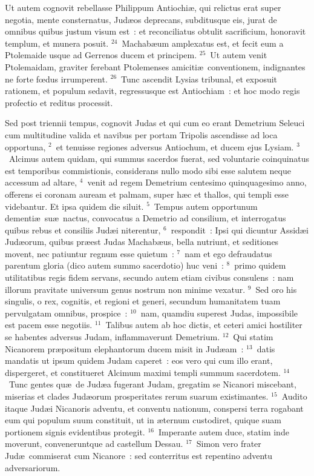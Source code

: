  Ut autem cognovit rebellasse Philippum Antiochi\ae , qui relictus erat super negotia, mente consternatus, Jud\ae os deprecans, subditusque eis, jurat de omnibus quibus justum visum est~: et reconciliatus obtulit sacrificium, honoravit templum, et munera posuit.
${}^{24}$~Machab\ae um amplexatus est, et fecit eum a Ptolemaide usque ad Gerrenos ducem et principem.
${}^{25}$~Ut autem venit Ptolemaidam, graviter ferebant Ptolemenses amiciti\ae\ conventionem, indignantes ne forte fœdus irrumperent.
${}^{26}$~Tunc ascendit Lysias tribunal, et exposuit rationem, et populum sedavit, regressusque est Antiochiam~: et hoc modo regis profectio et reditus processit.

\lettrine[lines=3,image=true,loversize=0.05,lraise=-0.03]{S}{}ed post triennii tempus, cognovit Judas et qui cum eo erant Demetrium Seleuci cum multitudine valida et navibus per portam Tripolis ascendisse ad loca opportuna,
${}^{2}$~et tenuisse regiones adversus Antiochum, et ducem ejus Lysiam.
${}^{3}$~Alcimus autem quidam, qui summus sacerdos fuerat, sed voluntarie coinquinatus est temporibus commistionis, considerans nullo modo sibi esse salutem neque accessum ad altare,
${}^{4}$~venit ad regem Demetrium centesimo quinquagesimo anno, offerens ei coronam auream et palmam, super h\ae c et thallos, qui templi esse videbantur. Et ipsa quidem die siluit.
${}^{5}$~Tempus autem opportunum dementi\ae\ su\ae\ nactus, convocatus a Demetrio ad consilium, et interrogatus quibus rebus et consiliis Jud\ae i niterentur,
${}^{6}$~respondit~: Ipsi qui dicuntur Assid\ae i Jud\ae orum, quibus pr\ae est Judas Machab\ae us, bella nutriunt, et seditiones movent, nec patiuntur regnum esse quietum~:
${}^{7}$~nam et ego defraudatus parentum gloria (dico autem summo sacerdotio) huc veni~:
${}^{8}$~primo quidem utilitatibus regis fidem servans, secundo autem etiam civibus consulens~: nam illorum pravitate universum genus nostrum non minime vexatur.
${}^{9}$~Sed oro his singulis, o rex, cognitis, et regioni et generi, secundum humanitatem tuam pervulgatam omnibus, prospice~:
${}^{10}$~nam, quamdiu superest Judas, impossibile est pacem esse negotiis.
${}^{11}$~Talibus autem ab hoc dictis, et ceteri amici hostiliter se habentes adversus Judam, inflammaverunt Demetrium.
${}^{12}$~Qui statim Nicanorem pr\ae positum elephantorum ducem misit in Jud\ae am~:
${}^{13}$~datis mandatis ut ipsum quidem Judam caperet~: eos vero qui cum illo erant, dispergeret, et constitueret Alcimum maximi templi summum sacerdotem.
${}^{14}$~Tunc gentes qu\ae\ de Jud\ae a fugerant Judam, gregatim se Nicanori miscebant, miserias et clades Jud\ae orum prosperitates rerum suarum existimantes.
${}^{15}$~Audito itaque Jud\ae i Nicanoris adventu, et conventu nationum, conspersi terra rogabant eum qui populum suum constituit, ut in \ae ternum custodiret, quique suam portionem signis evidentibus protegit.
${}^{16}$~Imperante autem duce, statim inde moverunt, conveneruntque ad castellum Dessau.
${}^{17}$~Simon vero frater Jud\ae\ commiserat cum Nicanore~: sed conterritus est repentino adventu adversariorum.


